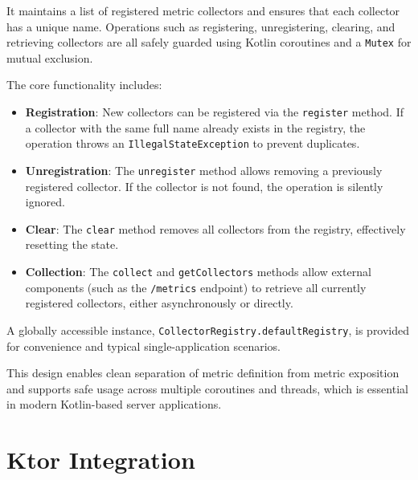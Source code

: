 It maintains a list of registered metric collectors and ensures that each collector has a unique name. Operations such as registering, unregistering, clearing, and retrieving collectors are all safely guarded using Kotlin coroutines and a \texttt{Mutex} for mutual exclusion.

The core functionality includes:
\begin{itemize}
    \item \textbf{Registration}: New collectors can be registered via the \texttt{register} method. If a collector with the same full name already exists in the registry, the operation throws an \texttt{IllegalStateException} to prevent duplicates.
    
    \item \textbf{Unregistration}: The \texttt{unregister} method allows removing a previously registered collector. If the collector is not found, the operation is silently ignored.
    
    \item \textbf{Clear}: The \texttt{clear} method removes all collectors from the registry, effectively resetting the state.
    
    \item \textbf{Collection}: The \texttt{collect} and \texttt{getCollectors} methods allow external components (such as the \texttt{/metrics} endpoint) to retrieve all currently registered collectors, either asynchronously or directly.
\end{itemize}

A globally accessible instance, \texttt{CollectorRegistry.defaultRegistry}, is provided for convenience and typical single-application scenarios.

This design enables clean separation of metric definition from metric exposition and supports safe usage across multiple coroutines and threads, which is essential in modern Kotlin-based server applications.



\section{Ktor Integration}
\lipsum[1]
